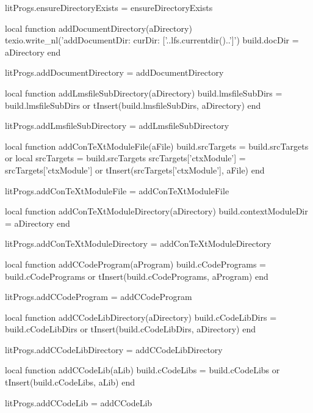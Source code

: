 litProgs.ensureDirectoryExists = ensureDirectoryExists

local function addDocumentDirectory(aDirectory)
  texio.write_nl('addDocumentDir: curDir: ['..lfs.currentdir()..']')
  build.docDir   = aDirectory
end

litProgs.addDocumentDirectory = addDocumentDirectory

local function addLmsfileSubDirectory(aDirectory)
  build.lmsfileSubDirs = build.lmsfileSubDirs or { }
  tInsert(build.lmsfileSubDirs, aDirectory)
end

litProgs.addLmsfileSubDirectory = addLmsfileSubDirectory

local function addConTeXtModuleFile(aFile)
  build.srcTargets = build.srcTargets or { }
  local srcTargets = build.srcTargets
  srcTargets['ctxModule'] = srcTargets['ctxModule'] or { }
  tInsert(srcTargets['ctxModule'], aFile)
end

litProgs.addConTeXtModuleFile = addConTeXtModuleFile

local function addConTeXtModuleDirectory(aDirectory)
  build.contextModuleDir = aDirectory
end

litProgs.addConTeXtModuleDirectory = addConTeXtModuleDirectory

local function addCCodeProgram(aProgram)
  build.cCodePrograms = build.cCodePrograms or { }
  tInsert(build.cCodePrograms, aProgram)
end

litProgs.addCCodeProgram = addCCodeProgram

local function addCCodeLibDirectory(aDirectory)
  build.cCodeLibDirs = build.cCodeLibDirs or { }
  tInsert(build.cCodeLibDirs, aDirectory)
end

litProgs.addCCodeLibDirectory = addCCodeLibDirectory

local function addCCodeLib(aLib)
  build.cCodeLibs = build.cCodeLibs or { }
  tInsert(build.cCodeLibs, aLib)
end

litProgs.addCCodeLib = addCCodeLib

